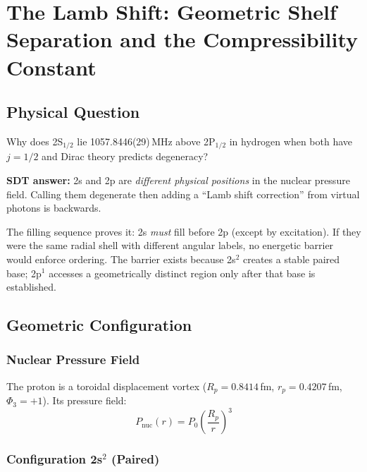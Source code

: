 \chapter{The Lamb Shift: Geometric Shelf Separation and the Compressibility Constant}



\section{Physical Question}

Why does 2S$_{1/2}$ lie 1057.8446(29)\,MHz above 2P$_{1/2}$ in hydrogen when both have $j = 1/2$ and Dirac theory predicts degeneracy?

\textbf{SDT answer:} 2s and 2p are \emph{different physical positions} in the nuclear pressure field.  Calling them degenerate then adding a ``Lamb shift correction'' from virtual photons is backwards.

The filling sequence proves it: 2s \emph{must} fill before 2p (except by excitation).  If they were the same radial shell with different angular labels, no energetic barrier would enforce ordering.  The barrier exists because 2s$^2$ creates a stable paired base; 2p$^1$ accesses a geometrically distinct region only after that base is established.


\section{Geometric Configuration}

\subsection{Nuclear Pressure Field}

The proton is a toroidal displacement vortex ($R_p = 0.8414$\,fm, $r_p = 0.4207$\,fm, $\Phi_3 = +1$).  Its pressure field:
\begin{equation}\label{eq:Pnuc}
  P_{\text{nuc}}(r) = P_0 \left(\frac{R_p}{r}\right)^{\!3}
\end{equation}

\subsection{Configuration 2s$^2$ (Paired)}

